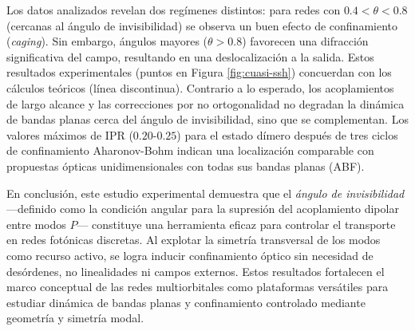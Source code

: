 Los datos analizados revelan dos regímenes distintos: para redes con $0.4 < \theta < 0.8$ (cercanas al ángulo de invisibilidad) se observa un buen efecto de confinamiento (\emph{caging}). Sin embargo, ángulos mayores ($\theta > 0.8$) favorecen una difracción significativa del campo, resultando en una deslocalización a la salida. Estos resultados experimentales (puntos en Figura \ref{fig:cuasi-ssh}) concuerdan con los cálculos teóricos (línea discontinua). Contrario a lo esperado, los acoplamientos de largo alcance y las correcciones por no ortogonalidad no degradan la dinámica de bandas planas cerca del ángulo de invisibilidad, sino que se complementan. Los valores máximos de IPR ($0.20$-$0.25$) para el estado dímero después de tres ciclos de confinamiento Aharonov-Bohm \cite{abcagingseba} indican una localización comparable con propuestas ópticas unidimensionales con todas sus bandas planas (ABF). 

En conclusión, este estudio experimental demuestra que el \textit{ángulo de invisibilidad} —definido como la condición angular para la supresión del acoplamiento dipolar entre modos $P$— constituye una herramienta eficaz para controlar el transporte en redes fotónicas discretas. Al explotar la simetría transversal de los modos como recurso activo, se logra inducir confinamiento óptico sin necesidad de desórdenes, no linealidades ni campos externos. Estos resultados fortalecen el marco conceptual de las redes multiorbitales como plataformas versátiles para estudiar dinámica de bandas planas y confinamiento controlado mediante geometría y simetría modal.

